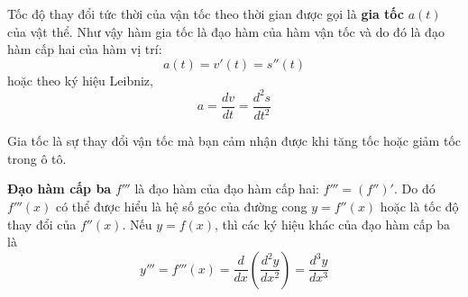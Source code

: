 \begin{minipage}[t]{0.75	extwidth}
    Tốc độ thay đổi tức thời của vận tốc theo thời gian được gọi là \textbf{gia tốc} $a(t)$ của vật thể. Như vậy hàm gia tốc là đạo hàm của hàm vận tốc và do đó là đạo hàm cấp hai của hàm vị trí:
    \[
        a(t) = v'(t) = s''(t)
    \]
    \noindent hoặc theo ký hiệu Leibniz,
    \[
        a = \frac{dv}{dt} = \frac{d^2s}{dt^2}
    \]

    Gia tốc là sự thay đổi vận tốc mà bạn cảm nhận được khi tăng tốc hoặc giảm tốc trong ô tô.

    \textbf{Đạo hàm cấp ba} $f'''$ là đạo hàm của đạo hàm cấp hai: $f''' = (f'')'$. Do đó $f'''(x)$ có thể được hiểu là hệ số góc của đường cong $y = f''(x)$ hoặc là tốc độ thay đổi của $f''(x)$. Nếu $y = f(x)$, thì các ký hiệu khác của đạo hàm cấp ba là
    \[
        y''' = f'''(x) = \frac{d}{dx}\left(\frac{d^2y}{dx^2}\right) = \frac{d^3y}{dx^3}
    \]
\end{minipage}
